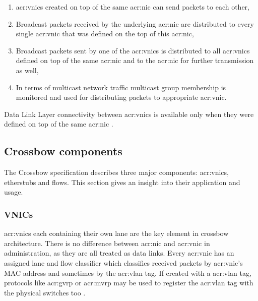 \documentclass[11pt,openany]{book}
\begin{document}
        \begin{enumerate}
          \item \gls{acr:vnic}s created on top of the same \gls{acr:nic} can send packets to each other,
          \item Broadcast packets received by the underlying \gls{acr:nic} are distributed to every single
                \gls{acr:vnic} that was defined on the top of this \gls{acr:nic},
          \item Broadcast packets sent by one of the \gls{acr:vnic}s is distributed to all \gls{acr:vnic}s defined on
                top of the same \gls{acr:nic} and to the \gls{acr:nic} for further transmission as well,
          \item In terms of multicast network traffic multicast group membership is monitored and used for distributing
                packets to appropriate \gls{acr:vnic}.
        \end{enumerate}

        Data Link Layer connectivity between \gls{acr:vnic}s is available only when they were defined on top of the same
        \gls{acr:nic} \cite{crossbow2}. 

	
      \subsection{Crossbow components}

        The Crossbow specification describes three major components: \gls{acr:vnic}s, etherstubs and flows. This section
        gives an insight into their application and usage.

                
        \subsubsection{VNICs}
        
          \gls{acr:vnic}s each containing their own lane are the key element in crossbow architecture. There is no
          difference between \gls{acr:nic} and \gls{acr:vnic} in administration, as they are all treated as data links.
          Every \gls{acr:vnic} has an assigned lane and flow classifier which classifies received packets by
          \gls{acr:vnic}'s MAC address and sometimes by the \gls{acr:vlan} tag.  If created with a \gls{acr:vlan} tag,
          protocols like \gls{acr:gvrp} or \gls{acr:mvrp} may be used to register the \gls{acr:vlan} tag with the
          physical switches too \cite{crossbow}.	
\end{document}
